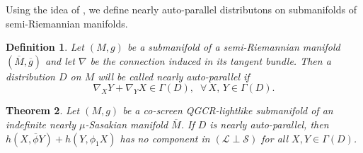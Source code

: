 \documentclass[reqno, 12pt]{amsart}
\numberwithin{equation}{section}
\newtheorem{theorem}{Theorem}[section]
\newtheorem{definition}[theorem]{Definition}
\begin{document}
Using the idea of \cite{MM}, we define nearly auto-parallel distributons on submanifolds of semi-Riemannian manifolds.
\begin{definition}\label{defn4}
 Let $(M,g)$ be a submanifold of a semi-Riemannian manifold $(\overline{M},\overline{g})$ and let $\nabla$  be the connection induced in its tangent bundle. Then a distribution $D$ on $M$ will be called nearly auto-parallel if 
       \begin{equation}\nonumber
       \nabla_{X}Y+\nabla_{Y}X\in\Gamma(D),\;\; \forall \, X,\,Y\in\Gamma(D).                                                                                                                                                                                                                                                                                                                                                                                                                                           \end{equation}
 \end{definition}
\begin{theorem}\label{theorem3}
  Let $(M,g)$ be a co-screen QGCR-lightlike submanifold of an indefinite nearly $\mu$-Sasakian manifold $\overline{M}$. If  $D$ is nearly auto-parallel, then $h(X,\overline{\phi}Y)+h(Y,\phi_{1}X)$ has no component in $(\mathcal{L}\perp\mathcal{S})$ for all $X,Y\in\Gamma(D)$.
\end{theorem}
\end{document}
